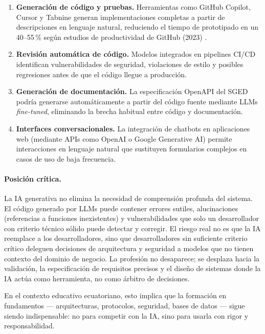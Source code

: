 \documentclass[12pt,a4paper]{article}
\begin{document}
\begin{enumerate}
  \item \textbf{Generación de código y pruebas.}
    Herramientas como GitHub Copilot, Cursor y Tabnine generan implementaciones completas
    a partir de descripciones en lenguaje natural, reduciendo el tiempo de prototipado
    en un 40--55\,\% según estudios de productividad de GitHub (2023) \parencite{github2023}.
  \item \textbf{Revisión automática de código.}
    Modelos integrados en pipelines CI/CD identifican vulnerabilidades de seguridad,
    violaciones de estilo y posibles regresiones antes de que el código llegue a producción.
  \item \textbf{Generación de documentación.}
    La especificación OpenAPI del SGED podría generarse automáticamente a partir del
    código fuente mediante LLMs \textit{fine-tuned}, eliminando la brecha habitual entre
    código y documentación.
  \item \textbf{Interfaces conversacionales.}
    La integración de chatbots en aplicaciones web (mediante APIs como OpenAI o Google
    Generative AI) permite interacciones en lenguaje natural que sustituyen formularios
    complejos en casos de uso de baja frecuencia.
\end{enumerate}

\paragraph{Posición crítica.}
La IA generativa no elimina la necesidad de comprensión profunda del sistema.
El código generado por LLMs puede contener errores sutiles, alucinaciones (referencias a
funciones inexistentes) y vulnerabilidades que solo un desarrollador con criterio técnico
sólido puede detectar y corregir.
El riesgo real no es que la IA reemplace a los desarrolladores, sino que desarrolladores
sin suficiente criterio crítico deleguen decisiones de arquitectura y seguridad a modelos
que no tienen contexto del dominio de negocio.
La profesión no desaparece; se desplaza hacia la validación, la especificación de
requisitos precisos y el diseño de sistemas donde la IA actúa como herramienta, no como
árbitro de decisiones.

En el contexto educativo ecuatoriano, esto implica que la formación en fundamentos
--- arquitecturas, protocolos, seguridad, bases de datos --- sigue siendo indispensable:
no para competir con la IA, sino para usarla con rigor y responsabilidad.
\end{document}

